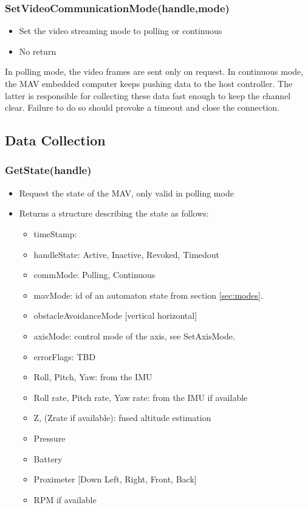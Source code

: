 \documentclass{article}
\begin{document}
\subsubsection{SetVideoCommunicationMode(handle,mode)}
\begin{itemize}
\item Set the video streaming mode to polling or continuous
\item No return
\end{itemize}
In polling mode, the video frames are sent only on request.
In continuous mode, the MAV embedded computer keeps pushing data to the host
controller. The latter is responsible for collecting these data fast enough to
keep the channel clear. Failure to do so should provoke a timeout and close the
connection.

\subsection{Data Collection}
\subsubsection{GetState(handle)}
\begin{itemize}
\item Request the state of the MAV, only valid in polling mode
\item Returns a structure describing the state as follows:
\begin{itemize}
\item timeStamp:
\item handleState: Active, Inactive, Revoked, Timedout
\item commMode: Polling, Continuous
\item mavMode: id of an automaton state from section \ref{sec:modes}.
\item obstacleAvoidanceMode [vertical horizontal]
\item axisMode: control mode of the axis, see SetAxisMode.
\item errorFlags: TBD
\item Roll, Pitch, Yaw: from the IMU
\item Roll rate, Pitch rate, Yaw rate: from the IMU if available
\item Z, (Zrate if available): fused altitude estimation
\item Pressure
\item Battery
\item Proximeter [Down Left, Right, Front, Back]
\item RPM if available
\end{itemize}
\end{itemize}
\end{document}
